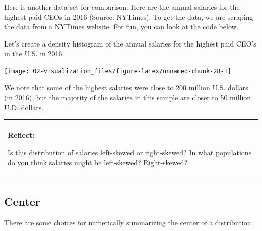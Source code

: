 \documentclass[
]{book}
\newenvironment{Shaded}{\begin{snugshade}}{\end{snugshade}}
\newcommand{\AttributeTok}[1]{\textcolor[rgb]{0.13,0.29,0.53}{#1}}
\newcommand{\DecValTok}[1]{\textcolor[rgb]{0.00,0.00,0.81}{#1}}
\newcommand{\FloatTok}[1]{\textcolor[rgb]{0.00,0.00,0.81}{#1}}
\newcommand{\FunctionTok}[1]{\textcolor[rgb]{0.13,0.29,0.53}{\textbf{#1}}}
\newcommand{\NormalTok}[1]{#1}
\newcommand{\SpecialCharTok}[1]{\textcolor[rgb]{0.81,0.36,0.00}{\textbf{#1}}}
\newcommand{\StringTok}[1]{\textcolor[rgb]{0.31,0.60,0.02}{#1}}
\newenvironment{reflect}
{
    \begin{center}
    
    \begin{tabular}{|p{0.8\textwidth}|}
    \rowcolor{LightBlue}
    \hline\\
    \rowcolor{LightBlue}
    \textbf{Reflect:}
}
{
    \\\rowcolor{LightBlue}
    \\\hline
    \end{tabular} 
    \end{center}
}
\begin{document}
Here is another data set for comparison. Here are the annual salaries for the highest paid CEOs in 2016 (Source: NYTimes). To get the data, we are scraping the data from a NYTimes website. For fun, you can look at the code below.

Let's create a density histogram of the annual salaries for the highest paid CEO's in the U.S. in 2016.

\begin{Shaded}
\end{Shaded}

\begin{center}\texttt{[image: 02-visualization\_files/figure-latex/unnamed-chunk-28-1]} \end{center}

We note that some of the highest salaries were close to 200 million U.S. dollars (in 2016), but the majority of the salaries in this sample are closer to 50 million U.D. dollars.

\begin{reflect}
Is this distribution of salaries left-skewed or right-skewed? In what
populations do you think salaries might be left-skewed? Right-skewed?
\end{reflect}

\subsection{Center}\label{center}

There are some choices for numerically summarizing the center of a distribution:
\end{document}

